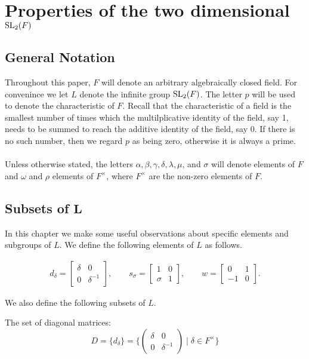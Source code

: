 \chapter{Properties of the two dimensional $\operatorname{SL}_2(F)$}\label{Ch5_PropertiesOfSLOverAlgClosedField}


\section{General Notation}

Throughout this paper, $F$ will denote an arbitrary algebraically closed field. For convenince we let $L$ denote the infinite group $\operatorname{SL}_2(F)$. The letter $p$ will be used to denote the characteristic of $F$. Recall that the characteristic of a field is the smallest number of times which the multilplicative identity of the field, say 1, needs to be summed to reach the additive identity of the field, say 0. If there is no such number, then we regard $p$ as being zero, otherwise it is always a prime. \\
\\
Unless otherwise stated, the letters $\alpha, \beta, \gamma, \delta, \lambda, \mu$, and $\sigma$ will denote elements of $F$ and $\omega$ and $\rho$ elements of $F^\times$, where $F^\times$  are the non-zero elements of $F$.

\section[Subsets of $L$]{Subsets of $\pmb{L}$}

In this chapter we make some useful observations about specific elements and subgroups of $L$. We define the following elements of $L$ as follows.

\begin{align*} d_\delta = \begin{bmatrix} \delta & 0 \\ 0 & \delta^{-1} \end{bmatrix}, \qquad s_\sigma = \begin{bmatrix} 1 & 0 \\ \sigma & 1 \end{bmatrix}, \qquad w = \begin{bmatrix} 0 & 1 \\ - 1 & 0 \end{bmatrix}  \tag{$\delta \in F^\times$ and $\sigma \in F$}.
\end{align*}

We also define the following subsets of $L$.
\begin{definition}
    The set of diagonal matrices: 
    \[
    D = \{d_\delta \} = \{\begin{pmatrix}\delta & 0\\ 0 & \delta^{-1}\end{pmatrix} \; | \; \delta \in F^\times \}
    \]
\end{definition}

